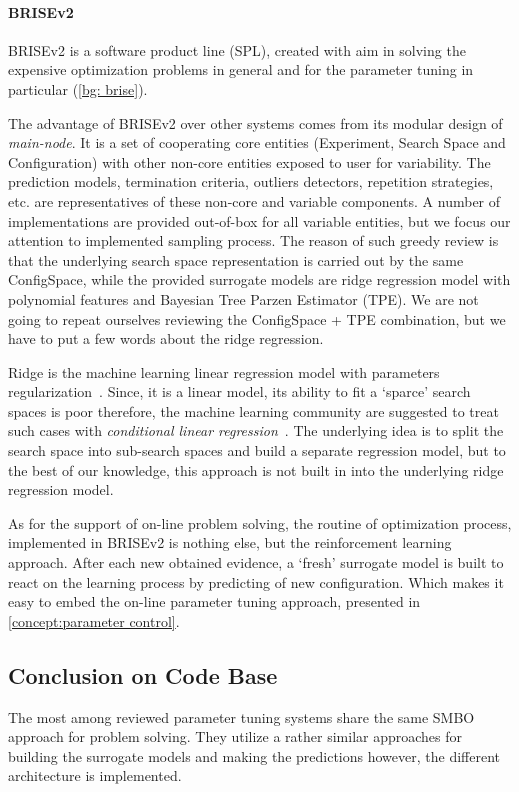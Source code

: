 \paragraph{BRISEv2}
BRISEv2 is a software product line (SPL), created with aim in solving the expensive optimization problems in general and for the parameter tuning in particular (\cref{bg: brise}).

The advantage of BRISEv2 over other systems comes from its modular design of \emph{main-node}. It is a set of cooperating core entities (Experiment, Search Space and Configuration) with other non-core entities exposed to user for variability. The prediction models, termination criteria, outliers detectors, repetition strategies, etc. are representatives of these non-core and variable components. A number of implementations are provided out-of-box for all variable entities, but we focus our attention to implemented sampling process. The reason of such greedy review is that the underlying search space representation is carried out by the same ConfigSpace, while the provided surrogate models are ridge regression model with polynomial features and Bayesian Tree Parzen Estimator (TPE). We are not going to repeat ourselves reviewing the ConfigSpace + TPE combination, but we have to put a few words about the ridge regression. 

Ridge is the machine learning linear regression model with parameters regularization~\cite{hoerl1970ridge}. Since, it is a linear model, its ability to fit a `sparce' search spaces is poor therefore, the machine learning community are suggested to treat such cases with \emph{conditional linear regression}~\cite{DBLP:journals/corr/abs-1806-02326}. The underlying idea is to split the search space into sub-search spaces and build a separate regression model, but to the best of our knowledge, this approach is not built in into the underlying ridge regression model.

As for the support of on-line problem solving, the routine of optimization process, implemented in BRISEv2 is nothing else, but the reinforcement learning approach. After each new obtained evidence, a `fresh' surrogate model is built to react on the learning process by predicting of new configuration. Which makes it easy to embed the on-line parameter tuning approach, presented in \cref{concept:parameter control}.


\subsection{Conclusion on Code Base}\label{impl:hlh code basis conclusion}
The most among reviewed parameter tuning systems share the same SMBO approach for problem solving. They utilize a rather similar approaches for building the surrogate models and making the predictions however, the different architecture is implemented.

